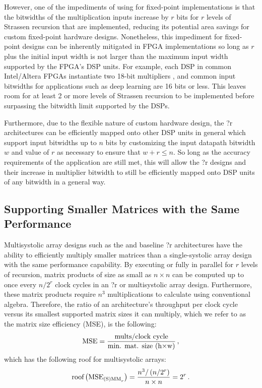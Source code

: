However, one of the impediments of using \sa for fixed-point implementations is that the bitwidths of the multiplication inputs increase by $r$ bits for $r$ levels of Strassen recursion that are implemented, reducing its potential area savings for custom fixed-point hardware designs.
Nonetheless, this impediment for fixed-point designs can be inherently mitigated in FPGA implementations so long as $r$ plus the initial input width is not larger than the maximum input width supported by the FPGA's DSP units.
For example, each DSP in common Intel/Altera FPGAs instantiate two 18-bit multipliers \cite{intel-dsp}, and common input bitwidths for applications such as deep learning are 16 bits or less.
This leaves room for at least 2 or more levels of Strassen recursion to be implemented before surpassing the bitwidth limit supported by the DSPs.

Furthermore, due to the flexible nature of custom hardware design, the \smm?r architectures can be efficiently mapped onto other DSP units in general which support input bitwidths up to $n$ bits by customizing the input datapath bitwidth $w$ and value of $r$ as necessary to ensure that $w+r \le n$.
So long as the accuracy requirements of the application are still met, this will allow the \smm?r designs and their increase in multiplier bitwidth to still be efficiently mapped onto DSP units of any bitwidth in a general way.

\subsection{Supporting Smaller Matrices with the Same Performance}
\label{smm:sec:mat-sz}
Multisystolic array designs such as the \smmArch and baseline \mm?r architectures have the ability to efficiently multiply smaller matrices than a single-systolic array design with the same performance capability.
By executing  or \seq fully in parallel for $r$ levels of recursion, matrix products of size as small as $n\times n$ can be computed up to once every $n/2^r$ clock cycles in an \mm?r or \smmArch multisystolic array design.
Furthermore, these matrix products require $n^3$ multiplications to calculate using conventional algebra.
Therefore, the ratio of an architecture's throughput per clock cycle versus its smallest supported matrix sizes it can multiply, which we refer to as the matrix size efficiency (MSE), is the following:
\begin{align} \label{smm:eq:mat-sz}
  \text{MSE} = 
  \frac{\text{mults}/\text{clock cycle}} {\text{min. mat. size (h$\times$w)}}
  \,,
\end{align}
which has the following roof for multisystolic arrays:
\begin{align} \label{smm:eq:mat-sz}
  \text{roof}\left(\text{MSE}_{\text{(S)MM}_r}\right)
  = \frac {n^3/\left( n/2^r\right)} {n\times n} = 2^r
  \,.
\end{align}


